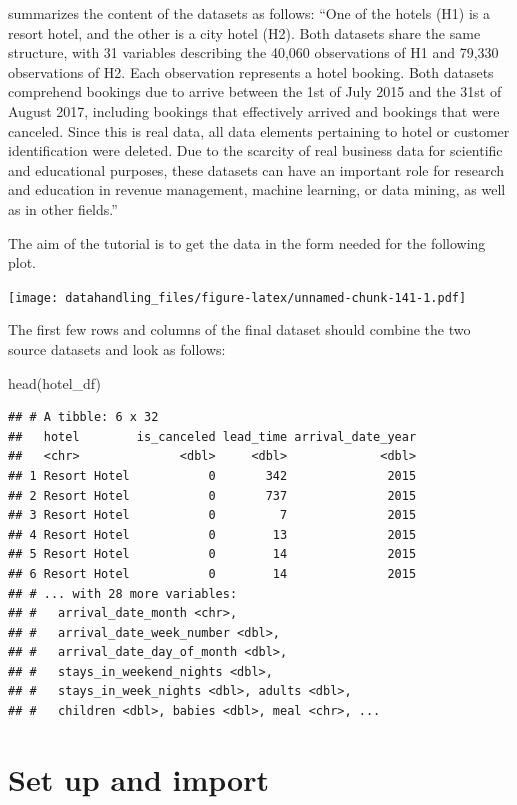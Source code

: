 \documentclass[
  12pt,
]{style/krantz}
\newenvironment{Shaded}{\begin{snugshade}}{\end{snugshade}}
\newcommand{\FunctionTok}[1]{\textcolor[rgb]{0.00,0.00,0.00}{#1}}
\newcommand{\NormalTok}[1]{#1}
\begin{document}
\citet{nuno_etal2019} summarizes the content of the datasets as follows: ``One of the hotels (H1) is a resort hotel, and the other is a city hotel (H2). Both datasets share the same structure, with 31 variables describing the 40,060 observations of H1 and 79,330 observations of H2. Each observation represents a hotel booking. Both datasets comprehend bookings due to arrive between the 1st of July 2015 and the 31st of August 2017, including bookings that effectively arrived and bookings that were canceled. Since this is real data, all data elements pertaining to hotel or customer identification were deleted. Due to the scarcity of real business data for scientific and educational purposes, these datasets can have an important role for research and education in revenue management, machine learning, or data mining, as well as in other fields.''

The aim of the tutorial is to get the data in the form needed for the following plot.

\texttt{[image: datahandling\_files/figure-latex/unnamed-chunk-141-1.pdf]}

The first few rows and columns of the final dataset should combine the two source datasets and look as follows:

\begin{Shaded}
\begin{Highlighting}[]
\FunctionTok{head}\NormalTok{(hotel\_df)}
\end{Highlighting}
\end{Shaded}

\begin{verbatim}
## # A tibble: 6 x 32
##   hotel        is_canceled lead_time arrival_date_year
##   <chr>              <dbl>     <dbl>             <dbl>
## 1 Resort Hotel           0       342              2015
## 2 Resort Hotel           0       737              2015
## 3 Resort Hotel           0         7              2015
## 4 Resort Hotel           0        13              2015
## 5 Resort Hotel           0        14              2015
## 6 Resort Hotel           0        14              2015
## # ... with 28 more variables:
## #   arrival_date_month <chr>,
## #   arrival_date_week_number <dbl>,
## #   arrival_date_day_of_month <dbl>,
## #   stays_in_weekend_nights <dbl>,
## #   stays_in_week_nights <dbl>, adults <dbl>,
## #   children <dbl>, babies <dbl>, meal <chr>, ...
\end{verbatim}

\hypertarget{set-up-and-import}{%
\section{Set up and import}\label{set-up-and-import}}
\end{document}
